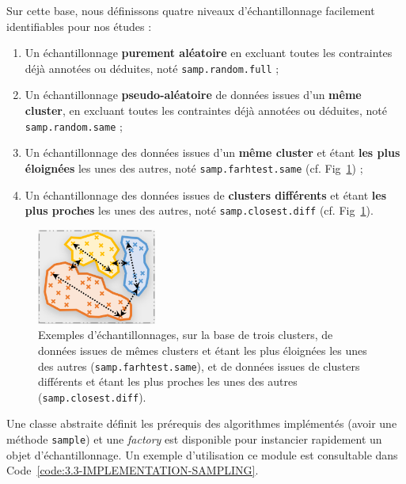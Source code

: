 		Sur cette base, nous définissons quatre niveaux d'échantillonnage facilement identifiables pour nos études :
		
		\begin{enumerate}
			\item Un échantillonnage \textbf{purement aléatoire} en excluant toutes les contraintes déjà annotées ou déduites, noté \texttt{samp.random.full} ;
			\item Un échantillonnage \textbf{pseudo-aléatoire} de données issues d'un \textbf{même cluster}, en excluant toutes les contraintes déjà annotées ou déduites, noté \texttt{samp.random.same} ;
			\item Un échantillonnage des données issues d'un \textbf{même cluster} et étant \textbf{les plus éloignées} les unes des autres, noté \texttt{samp.farhtest.same} (cf. Fig~\ref{figure:3.3-CONTRAINTES-SAMPLING}) ;
			\item Un échantillonnage des données issues de \textbf{clusters différents} et étant \textbf{les plus proches} les unes des autres, noté \texttt{samp.closest.diff} (cf. Fig~\ref{figure:3.3-CONTRAINTES-SAMPLING}).
		\end{enumerate}
		
		\begin{figure}[!htb]
			\centering
			\includegraphics[width=0.35\textwidth]{figures/example-sampling}
			\caption{Exemples d’échantillonnages, sur la base de trois clusters, de données issues de mêmes clusters et étant les plus éloignées les unes des autres (\texttt{samp.farhtest.same}), et de données issues de clusters différents et étant les plus proches les unes des autres (\texttt{samp.closest.diff}).}
			\label{figure:3.3-CONTRAINTES-SAMPLING}
		\end{figure}

		Une classe abstraite définit les prérequis des algorithmes implémentés (avoir une méthode \texttt{sample}) et une \textit{factory} est disponible pour instancier rapidement un objet d'échantillonnage.
		Un exemple d'utilisation ce module est consultable dans Code~\ref{code:3.3-IMPLEMENTATION-SAMPLING}.
		
